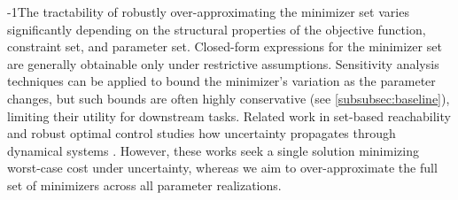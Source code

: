 \documentclass[letterpaper, 10 pt, conference]{ieeeconf}
\newcommand{\?}{\stackrel{?}{=}}
\newcommand{\obj}{J}
\newcommand{\param}{\theta}
\newcommand{\paramSet}{\Theta}
\newcommand{\constraintSet}{{S_{\mathcal{C}}}}
\newcommand{\frank}[1]{{\textcolor[rgb]{0,0,1}{\textsf{[Frank: {#1}]}}}}
\newcommand{\antoine}[1]{{\textcolor[rgb]{1,0,0}{\textsf{[Antoine: {#1}]}}}}
\begin{document}
\looseness-1The tractability of robustly over-approximating the minimizer set varies significantly depending on the structural properties of the objective function, constraint set, and parameter set. 
Closed-form expressions for the minimizer set are generally obtainable only under restrictive assumptions. 
Sensitivity analysis techniques
can be applied to bound the minimizer's variation
as the parameter changes,
but such bounds are often highly conservative (see \ref{subsubsec:baseline}), limiting their utility for downstream tasks.
Related work in set-based reachability and robust optimal control studies how uncertainty propagates through dynamical systems \cite{althoff2008reachability, schafer2025robust}. However, these works seek a single solution minimizing worst-case cost under uncertainty, whereas we aim to over-approximate the full set of minimizers across all parameter realizations.



\end{document}

